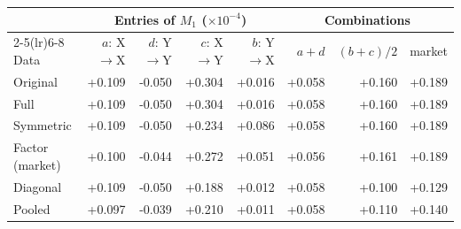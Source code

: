 \begin{tabular}{lrrrrrrr}
\toprule
 & \multicolumn{4}{c}{Entries of $M_1$ ($\times 10^{-4}$)} & \multicolumn{3}{c}{Combinations} \\
\cmidrule(lr){2-5}\cmidrule(lr){6-8}
Data & $a$: X$\to$X & $d$: Y$\to$Y & $c$: X$\to$Y & $b$: Y$\to$X & $a+d$ & $(b+c)/2$ & market \\
\midrule
Original & +0.109 & -0.050 & +0.304 & +0.016 & +0.058 & +0.160 & +0.189 \\
\midrule
Full & +0.109 & -0.050 & +0.304 & +0.016 & +0.058 & +0.160 & +0.189 \\
Symmetric & +0.109 & -0.050 & +0.234 & +0.086 & +0.058 & +0.160 & +0.189 \\
Factor (market) & +0.100 & -0.044 & +0.272 & +0.051 & +0.056 & +0.161 & +0.189 \\
Diagonal & +0.109 & -0.050 & +0.188 & +0.012 & +0.058 & +0.100 & +0.129 \\
Pooled & +0.097 & -0.039 & +0.210 & +0.011 & +0.058 & +0.110 & +0.140 \\
\bottomrule
\end{tabular}